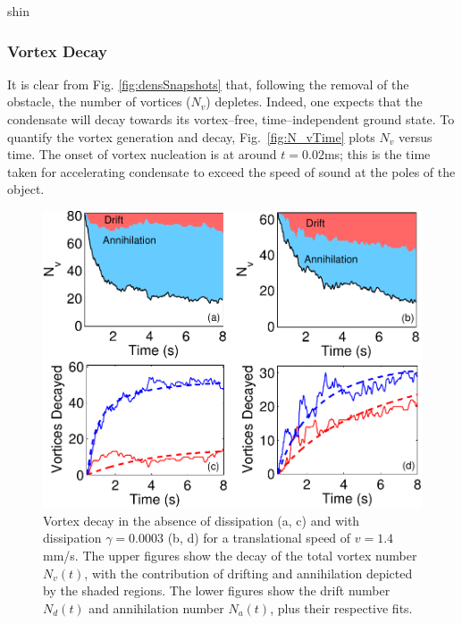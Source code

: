 \begin{chapter}{\label{cha:shin}shin}
\subsubsection{Vortex Decay}
It is clear from Fig. \ref{fig:densSnapshots} that, following the removal 
of the obstacle, the number of vortices ($N_v$) depletes.   
Indeed, one expects that the condensate will decay towards its 
vortex--free, time--independent ground state.  To quantify the vortex generation and
decay, Fig.~\ref{fig:N_vTime} plots $N_v$ versus time. 
The onset of vortex nucleation is at around $t=0.02$ms; 
this is the time taken for accelerating condensate to exceed the speed of 
sound at the poles of the object.
\begin{figure}
\begin{minipage}{0.6\textwidth}
\centering
\includegraphics[width=0.9\linewidth]{shin/fig4}
\end{minipage} \hfill
\begin{minipage}{0.4\textwidth}
\caption{\label{fig:N_vLong} Vortex decay in the absence of dissipation (a, c) and with dissipation $\gamma=0.0003$ (b, d) for a translational speed of $v=1.4$mm/s.  The upper figures show the decay of the total vortex number $N_v(t)$, with the contribution of drifting and annihilation depicted by the shaded regions.  The lower figures show the drift number $N_d(t)$ and annihilation number $N_a(t)$, plus their respective fits.}
\end{minipage} \hfill
\end{figure}


\end{chapter}

